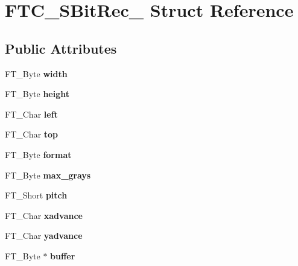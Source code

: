 \hypertarget{struct_f_t_c___s_bit_rec__}{}\section{F\+T\+C\+\_\+\+S\+Bit\+Rec\+\_\+ Struct Reference}
\label{struct_f_t_c___s_bit_rec__}
\subsection*{Public Attributes}
\begin{DoxyCompactItemize}
\item 
\mbox{\label{struct_f_t_c___s_bit_rec___a5b92fb4f213a880f758bb87ac2ceb263}} 
F\+T\+\_\+\+Byte {\bfseries width}
\item 
\mbox{\label{struct_f_t_c___s_bit_rec___a5953efe2aded3b184875d5e5d08cafef}} 
F\+T\+\_\+\+Byte {\bfseries height}
\item 
\mbox{\label{struct_f_t_c___s_bit_rec___aef273749f4fdb9943500ec6df8412a94}} 
F\+T\+\_\+\+Char {\bfseries left}
\item 
\mbox{\label{struct_f_t_c___s_bit_rec___a3e558b3a04b70f00f80b862cdc94d9a2}} 
F\+T\+\_\+\+Char {\bfseries top}
\item 
\mbox{\label{struct_f_t_c___s_bit_rec___a3d3fcc2869ce5c95f0f63898e6cef8be}} 
F\+T\+\_\+\+Byte {\bfseries format}
\item 
\mbox{\label{struct_f_t_c___s_bit_rec___a83958d4649a898312de9a7274550dff9}} 
F\+T\+\_\+\+Byte {\bfseries max\+\_\+grays}
\item 
\mbox{\label{struct_f_t_c___s_bit_rec___a1382ec014df599e706c2c1785bc18235}} 
F\+T\+\_\+\+Short {\bfseries pitch}
\item 
\mbox{\label{struct_f_t_c___s_bit_rec___a502a0bb69d973d2ae626a842eb9fefd3}} 
F\+T\+\_\+\+Char {\bfseries xadvance}
\item 
\mbox{\label{struct_f_t_c___s_bit_rec___aabe767ddaf7ff62918886c6f62e9ac28}} 
F\+T\+\_\+\+Char {\bfseries yadvance}
\item 
\mbox{\label{struct_f_t_c___s_bit_rec___abe4d78fc3f411d67e7fc43f7aa21bd1d}} 
F\+T\+\_\+\+Byte $\ast$ {\bfseries buffer}
\end{DoxyCompactItemize}


